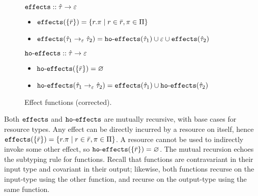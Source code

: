 \begin{figure}
\vspace{-0.5cm}

$\mathtt{effects} :: \hat \tau \rightarrow \varepsilon$

\begin{itemize}
	\setlength\itemsep{-0.2em}
	\item[] $\mathtt{effects}(\{ \bar r \}) = \{ r.\pi \mid r \in \bar r, \pi \in \Pi \}$
	\item[] $\mathtt{effects}(\hat \tau_1 \rightarrow_{\varepsilon} \hat \tau_2) = \mathtt{ho \hbox{-} effects}(\hat \tau_1) \cup \varepsilon \cup \mathtt{effects}(\hat \tau_2)$
\end{itemize}

$\mathtt{ho \hbox{-} effects} :: \hat \tau \rightarrow \varepsilon$

\begin{itemize}
	\setlength\itemsep{-0.2em}
	\item[] $\mathtt{ho \hbox{-} effects}(\{ \bar r \}) = \varnothing$
	\item[] $\mathtt{ho \hbox{-} effects}(\hat \tau_1 \rightarrow_{\varepsilon} \hat \tau_2) = \mathtt{effects}(\hat \tau_1) \cup \mathtt{ho \hbox{-} effects}(\hat \tau_2)$
\end{itemize}

\vspace{-0.5cm}
\caption{Effect functions (corrected).}
\vspace{-0.5cm}
\label{fig:fx_defns}
\end{figure}

Both $\mathtt{effects}$ and $\mathtt{ho \hbox{-} effects}$ are mutually recursive,
with base cases for resource types. Any effect can be directly
incurred by a resource on itself, hence
$\mathtt{effects}(\{ \bar r \}) = \{ r.\pi \mid r \in \bar r, \pi \in \Pi \}$. A
resource cannot be used to indirectly invoke some other effect, so
$\mathtt{ho \hbox{-} effects}(\{ \bar r \}) = \varnothing$. The mutual recursion echoes the
subtyping rule for functions. Recall that functions are contravariant
in their input type and covariant in their output; likewise, both
functions recurse on the input-type using the other function, and
recurse on the output-type using the same function.


